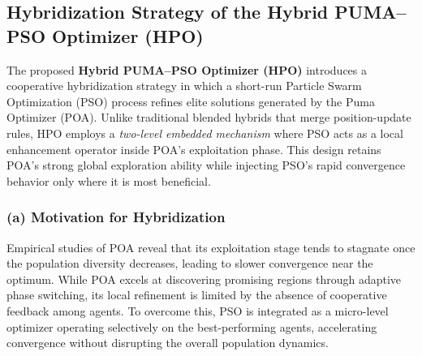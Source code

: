 \documentclass[a4paper,12pt]{article}
\begin{document}
\subsection{Hybridization Strategy of the Hybrid PUMA--PSO Optimizer (HPO)}

The proposed \textbf{Hybrid PUMA--PSO Optimizer (HPO)} introduces a cooperative hybridization strategy in which a short-run Particle Swarm Optimization (PSO) process refines elite solutions generated by the Puma Optimizer (POA). Unlike traditional blended hybrids that merge position-update rules, HPO employs a \textit{two-level embedded mechanism} where PSO acts as a local enhancement operator inside POA’s exploitation phase. This design retains POA’s strong global exploration ability while injecting PSO’s rapid convergence behavior only where it is most beneficial.

\subsubsection*{(a) Motivation for Hybridization}
Empirical studies of POA reveal that its exploitation stage tends to stagnate once the population diversity decreases, leading to slower convergence near the optimum. While POA excels at discovering promising regions through adaptive phase switching, its local refinement is limited by the absence of cooperative feedback among agents. To overcome this, PSO is integrated as a micro-level optimizer operating selectively on the best-performing agents, accelerating convergence without disrupting the overall population dynamics.
\end{document}
